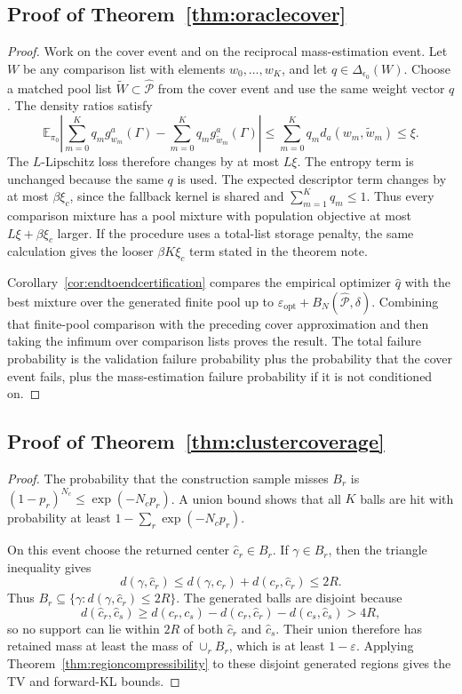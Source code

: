 \documentclass[twoside,11pt]{article}
\newcommand{\E}{\mathbb{E}}
\begin{document}
\subsection{Proof of Theorem~\ref{thm:oraclecover}}

\begin{proof} Work on the cover event and on the reciprocal mass-estimation event. Let \(W\) be any comparison list with elements \(w_0,\dots,w_K\), and let \(q\in\Delta_{\epsilon_0}(W)\). Choose a matched pool list \(\widetilde W\subset\widehat{\mathcal P}\) from the cover event and use the same weight vector \(q\). The density ratios satisfy
\[
\E_{\pi_0}\left| \sum_{m=0}^K q_m g_{w_m}^a(\Gamma) - \sum_{m=0}^K q_m g_{\widetilde w_m}^a(\Gamma) \right| \le \sum_{m=0}^K q_m d_a(w_m,\widetilde w_m) \le \xi .
\]
The \(L\)-Lipschitz loss therefore changes by at most \(L\xi\). The entropy term is unchanged because the same \(q\) is used. The expected descriptor term changes by at most \(\beta\xi_c\), since the fallback kernel is shared and \(\sum_{m=1}^Kq_m\le1\). Thus every comparison mixture has a pool mixture with population objective at most \(L\xi+\beta\xi_c\) larger. If the procedure uses a total-list storage penalty, the same calculation gives the looser \(\beta K\xi_c\) term stated in the theorem note.

Corollary~\ref{cor:endtoendcertification} compares the empirical optimizer \(\widehat q\) with the best mixture over the generated finite pool up to \(\varepsilon_{\mathrm{opt}}+B_N(\widehat{\mathcal P},\delta)\). Combining that finite-pool comparison with the preceding cover approximation and then taking the infimum over comparison lists proves the result. The total failure probability is the validation failure probability plus the probability that the cover event fails, plus the mass-estimation failure probability if it is not conditioned on.
\end{proof}

\subsection{Proof of Theorem~\ref{thm:clustercoverage}}

\begin{proof} The probability that the construction sample misses \(B_r\) is \((1-p_r)^{N_c}\le\exp(-N_c p_r)\). A union bound shows that all \(K\) balls are hit with probability at least \(1-\sum_r\exp(-N_c p_r)\).

On this event choose the returned center \(\widehat c_r\in B_r\). If \(\gamma\in B_r\), then the triangle inequality gives
\[
d(\gamma,\widehat c_r)\le d(\gamma,c_r)+d(c_r,\widehat c_r)\le2R.
\]
Thus \(B_r\subseteq\{\gamma:d(\gamma,\widehat c_r)\le2R\}\). The generated balls are disjoint because
\[
d(\widehat c_r,\widehat c_s) \ge d(c_r,c_s)-d(c_r,\widehat c_r)-d(c_s,\widehat c_s) >4R,
\]
so no support can lie within \(2R\) of both \(\widehat c_r\) and \(\widehat c_s\). Their union therefore has retained mass at least the mass of \(\cup_r B_r\), which is at least \(1-\varepsilon\). Applying Theorem~\ref{thm:regioncompressibility} to these disjoint generated regions gives the TV and forward-KL bounds.
\end{proof}
\end{document}
